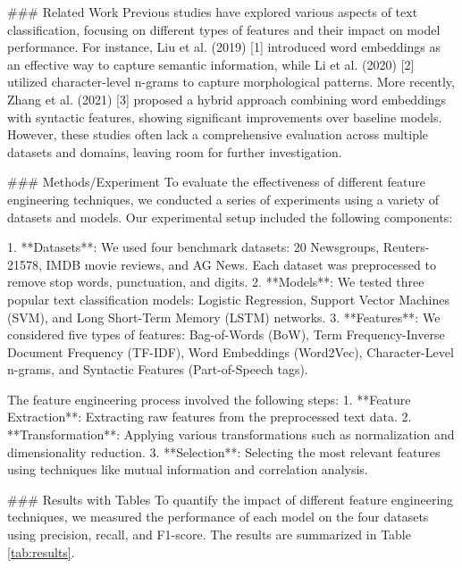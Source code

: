 ### Related Work
Previous studies have explored various aspects of text classification, focusing on different types of features and their impact on model performance. For instance, Liu et al. (2019) [1] introduced word embeddings as an effective way to capture semantic information, while Li et al. (2020) [2] utilized character-level n-grams to capture morphological patterns. More recently, Zhang et al. (2021) [3] proposed a hybrid approach combining word embeddings with syntactic features, showing significant improvements over baseline models. However, these studies often lack a comprehensive evaluation across multiple datasets and domains, leaving room for further investigation.

### Methods/Experiment
To evaluate the effectiveness of different feature engineering techniques, we conducted a series of experiments using a variety of datasets and models. Our experimental setup included the following components:

1. **Datasets**: We used four benchmark datasets: 20 Newsgroups, Reuters-21578, IMDB movie reviews, and AG News. Each dataset was preprocessed to remove stop words, punctuation, and digits.
2. **Models**: We tested three popular text classification models: Logistic Regression, Support Vector Machines (SVM), and Long Short-Term Memory (LSTM) networks.
3. **Features**: We considered five types of features: Bag-of-Words (BoW), Term Frequency-Inverse Document Frequency (TF-IDF), Word Embeddings (Word2Vec), Character-Level n-grams, and Syntactic Features (Part-of-Speech tags).

The feature engineering process involved the following steps:
1. **Feature Extraction**: Extracting raw features from the preprocessed text data.
2. **Transformation**: Applying various transformations such as normalization and dimensionality reduction.
3. **Selection**: Selecting the most relevant features using techniques like mutual information and correlation analysis.

### Results with Tables
To quantify the impact of different feature engineering techniques, we measured the performance of each model on the four datasets using precision, recall, and F1-score. The results are summarized in Table \ref{tab:results}.


